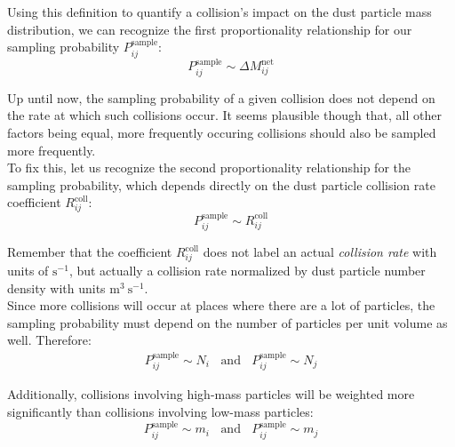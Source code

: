     Using this definition to quantify a collision's impact on the dust particle mass distribution,
    we can recognize the first proportionality relationship for our sampling probability
    $P^\text{sample}_{ij}$:
    \begin{equation}
        P_{ij}^\text{sample} \sim \Delta M^\text{net}_{ij}
    \end{equation}

    \clearpage

    Up until now, the sampling probability of a given collision does not depend on the rate at 
    which such collisions occur. 
    It seems plausible though that, all other factors being equal, more frequently occuring 
    collisions should also be sampled more frequently. \\

    To fix this, let us recognize the second proportionality
    relationship for the sampling probability, which depends directly on the dust particle 
    collision rate coefficient $R_{ij}^\text{coll}$:
    \begin{equation}
        P_{ij}^\text{sample} \sim R^\text{coll}_{ij}
    \end{equation}

    Remember that the coefficient $R^\text{coll}_{ij}$ does not label an actual 
    \textit{collision rate} with units of $\text{s}^{-1}$, but actually a collision rate normalized 
    by dust particle number density with units $\text{m}^{3}\ \text{s}^{-1}$. \\

    Since more collisions will occur at places where there are a lot of particles, the 
    sampling probability must depend on the number of particles per unit volume as well. 
    Therefore:
    \begin{align}
        P_{ij}^\text{sample} \sim N_i 
        \ \ \ \ \text{and} \ \ \ \
        P_{ij}^\text{sample} \sim N_j
    \end{align}

    Additionally, collisions involving high-mass particles will be weighted more significantly 
    than collisions involving low-mass particles:
    \begin{equation}
        P_{ij}^\text{sample} \sim m_i
        \ \ \ \ \text{and} \ \ \ \
        P_{ij}^\text{sample} \sim m_j
    \end{equation}


